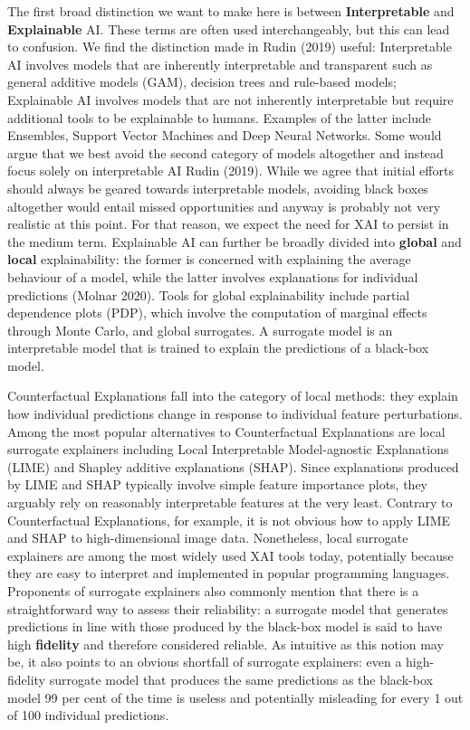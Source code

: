 \documentclass{juliacon}
\begin{document}
The first broad distinction we want to make here is between
\textbf{Interpretable} and \textbf{Explainable} AI. These terms are
often used interchangeably, but this can lead to confusion. We find the
distinction made in Rudin (2019) useful: Interpretable AI involves
models that are inherently interpretable and transparent such as general
additive models (GAM), decision trees and rule-based models; Explainable
AI involves models that are not inherently interpretable but require
additional tools to be explainable to humans. Examples of the latter
include Ensembles, Support Vector Machines and Deep Neural Networks.
Some would argue that we best avoid the second category of models
altogether and instead focus solely on interpretable AI Rudin (2019).
While we agree that initial efforts should always be geared towards
interpretable models, avoiding black boxes altogether would entail
missed opportunities and anyway is probably not very realistic at this
point. For that reason, we expect the need for XAI to persist in the
medium term. Explainable AI can further be broadly divided into
\textbf{global} and \textbf{local} explainability: the former is
concerned with explaining the average behaviour of a model, while the
latter involves explanations for individual predictions (Molnar 2020).
Tools for global explainability include partial dependence plots (PDP),
which involve the computation of marginal effects through Monte Carlo,
and global surrogates. A surrogate model is an interpretable model that
is trained to explain the predictions of a black-box model.

Counterfactual Explanations fall into the category of local methods:
they explain how individual predictions change in response to individual
feature perturbations. Among the most popular alternatives to
Counterfactual Explanations are local surrogate explainers including
Local Interpretable Model-agnostic Explanations (LIME) and Shapley
additive explanations (SHAP). Since explanations produced by LIME and
SHAP typically involve simple feature importance plots, they arguably
rely on reasonably interpretable features at the very least. Contrary to
Counterfactual Explanations, for example, it is not obvious how to apply
LIME and SHAP to high-dimensional image data. Nonetheless, local
surrogate explainers are among the most widely used XAI tools today,
potentially because they are easy to interpret and implemented in
popular programming languages. Proponents of surrogate explainers also
commonly mention that there is a straightforward way to assess their
reliability: a surrogate model that generates predictions in line with
those produced by the black-box model is said to have high
\textbf{fidelity} and therefore considered reliable. As intuitive as
this notion may be, it also points to an obvious shortfall of surrogate
explainers: even a high-fidelity surrogate model that produces the same
predictions as the black-box model 99 per cent of the time is useless
and potentially misleading for every 1 out of 100 individual
predictions.
\end{document}
